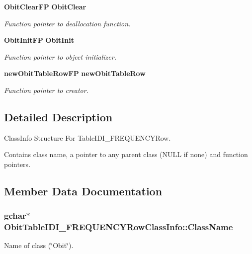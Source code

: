 \begin{CompactItemize}
{\bf Obit\-Clear\-FP} {\bf Obit\-Clear}
\begin{CompactList}\small\item\em Function pointer to deallocation function. \item\end{CompactList}\item 
{\bf Obit\-Init\-FP} {\bf Obit\-Init}
\begin{CompactList}\small\item\em Function pointer to object initializer. \item\end{CompactList}\item 
{\bf new\-Obit\-Table\-Row\-FP} {\bf new\-Obit\-Table\-Row}
\begin{CompactList}\small\item\em Function pointer to creator. \item\end{CompactList}\end{CompactItemize}


\subsection{Detailed Description}
Class\-Info Structure For Table\-IDI\_\-FREQUENCYRow. 

Contains class name, a pointer to any parent class (NULL if none) and function pointers. 



\subsection{Member Data Documentation}
\subsubsection{\setlength{\rightskip}{0pt plus 5cm}gchar$\ast$ {\bf Obit\-Table\-IDI\_\-FREQUENCYRow\-Class\-Info::Class\-Name}}\label{structObitTableIDI__FREQUENCYRowClassInfo_o2}


Name of class (\char`\"{}Obit\char`\"{}). 

